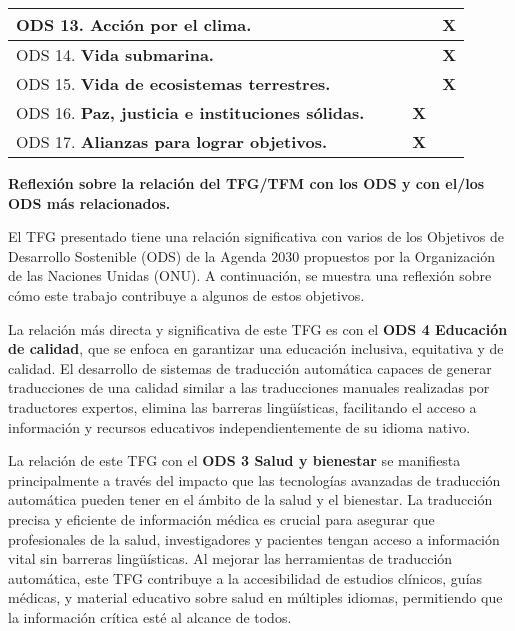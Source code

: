 \documentclass[11pt]{article}
\begin{document}
\begin{tabular}{|l|c|c|c|c|}
ODS 13. \textbf{Acci\'on por el clima.}                        & & & & \textbf{X} \\ \hline
ODS 14. \textbf{Vida submarina.}                               & & & & \textbf{X} \\ \hline
ODS 15. \textbf{Vida de ecosistemas terrestres.}               & & & & \textbf{X} \\ \hline
ODS 16. \textbf{Paz, justicia e instituciones s\'olidas.}      & & & \textbf{X} & \\ \hline
ODS 17. \textbf{Alianzas para lograr objetivos.}               & & & \textbf{X} & \\ \hline
\end{tabular}

\newpage

\vspace*{3ex}

\textbf{Reflexi\'on sobre la relaci\'on del TFG/TFM con los ODS y con el/los ODS m\'as relacionados.}

\vspace{1ex}


El TFG presentado tiene una relación significativa con varios de los Objetivos de Desarrollo Sostenible (ODS) de la Agenda 2030 propuestos por la Organización de las Naciones Unidas (ONU). A continuación, se muestra una reflexión sobre cómo este trabajo contribuye a algunos de estos objetivos.

\vspace{1ex}

La relación más directa y significativa de este TFG es con el \textbf{ODS 4 Educación de calidad}, que se enfoca en garantizar una educación inclusiva, equitativa y de calidad. El desarrollo de sistemas de traducción automática capaces de generar traducciones de una calidad similar a las traducciones manuales realizadas por traductores expertos, elimina las barreras lingüísticas, facilitando el acceso a información y recursos educativos independientemente de su idioma nativo. 

\vspace{1ex}

La relación de este TFG con el \textbf{ODS 3 Salud y bienestar} se manifiesta principalmente a través del impacto que las tecnologías avanzadas de traducción automática pueden tener en el ámbito de la salud y el bienestar. La traducción precisa y eficiente de información médica es crucial para asegurar que profesionales de la salud, investigadores y pacientes tengan acceso a información vital sin barreras lingüísticas. Al mejorar las herramientas de traducción automática, este TFG contribuye a la accesibilidad de estudios clínicos, guías médicas, y material educativo sobre salud en múltiples idiomas, permitiendo que la información crítica esté al alcance de todos.
\end{document}
